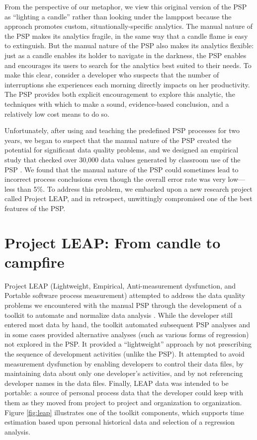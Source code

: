 \documentclass[]{article}
\begin{document}
From the perspective of our metaphor, we view this original version of the PSP as
``lighting a candle'' rather than looking under the lamppost because the approach promotes
custom, situationally-specific analytics. The manual nature of the PSP makes its analytics
fragile, in the same way that a candle flame is easy to extinguish.  But the manual nature
of the PSP also makes its analytics flexible: just as a candle enables its holder to
navigate in the darkness, the PSP enables and encourages its users to search for the
analytics best suited to their needs.  To make this clear, consider a developer who
suspects that the number of interruptions she experiences each morning directly impacts on
her productivity.  The PSP provides both explicit encouragement to explore this analytic,
the techniques with which to make a sound, evidence-based conclusion, and a relatively low cost
means to do so.  

Unfortunately, after using and teaching the predefined PSP processes for two years, we
began to suspect that the manual nature of the PSP created the potential for significant
data quality problems, and we designed an empirical study that 
checked over 30,000 data values generated by classroom use of the PSP
\cite{csdl-98-11}. We found that the manual nature of the PSP could sometimes lead to
incorrect process conclusions even though the overall error rate was very low---less than
5\%.  To address this problem, we embarked upon a new research project called Project
LEAP, and in retrospect, unwittingly compromised one of the best features of the PSP.

\section{Project LEAP: From candle to campfire} 

Project LEAP (Lightweight, Empirical, Anti-measurement dysfunction, and Portable software
process measurement) attempted to address the data quality problems we encountered with the manual
PSP through the development of a toolkit to automate and normalize data analysis
\cite{csdl-99-08}.  While the developer still entered most data by hand, the
toolkit automated subsequent PSP analyses and in some cases provided alternative
analyses (such as various forms of regression) not explored in the PSP.  It provided a
``lightweight'' approach by not prescribing the sequence of development activities 
(unlike the PSP). It attempted to avoid measurement dysfunction by enabling
developers to control their data files, by maintaining data about only one developer's
activities, and by not referencing developer names in the data files. Finally, LEAP data
was intended to be portable: a source of personal process data that the developer could
keep with them as they moved from project to project and organization to organization.
Figure \ref{fig:leap} illustrates one of the toolkit components, which supports time
estimation based upon personal historical data and selection of a regression analysis.
\end{document}
